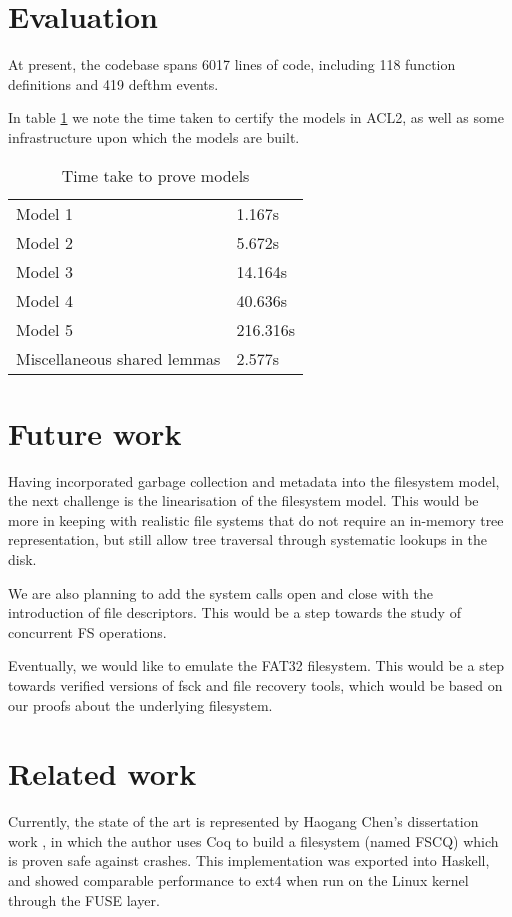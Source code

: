 \documentclass[format=sigconf,review=true]{acmart}
\begin{document}
\section{Evaluation}
At present, the codebase spans 6017 lines of code, including 118
function definitions and 419 defthm events.

In table \ref{certification-timing-table} we note the time taken to certify
the models in ACL2, as well as some infrastructure upon which the
models are built.

\begin{table}[]
  \centering
  \caption{Time take to prove models}
  \label{certification-timing-table}
  \begin{tabular}{ll}
    Model 1 & 1.167s \\
    Model 2 & 5.672s \\
    Model 3 & 14.164s \\
    Model 4 & 40.636s \\
    Model 5 & 216.316s \\
    Miscellaneous shared lemmas & 2.577s \\
  \end{tabular}
\end{table}

\section{Future work}
Having incorporated garbage collection and metadata into the
filesystem model, the next challenge is the linearisation of the
filesystem model. This would be more in keeping
with realistic file systems that do not require an in-memory tree
representation, but still allow tree traversal through systematic
lookups in the disk.

We are also planning to add the system calls open and close with the
introduction of file descriptors. This would be a step towards the
study of concurrent FS operations.

Eventually, we would like to emulate the FAT32 filesystem. This would
be a step towards verified versions of fsck and file recovery tools,
which would be based on our proofs about the underlying filesystem.

\section{Related work}
Currently, the state of the art is represented by Haogang
Chen's dissertation work \cite{DBLP:conf/usenix/ChenZCCKZ16}, in which
the author uses Coq to build a filesystem (named FSCQ) which is proven
safe against crashes. This implementation was exported into Haskell,
and showed comparable performance to ext4 when run on the Linux kernel
through the FUSE layer.
\end{document}
